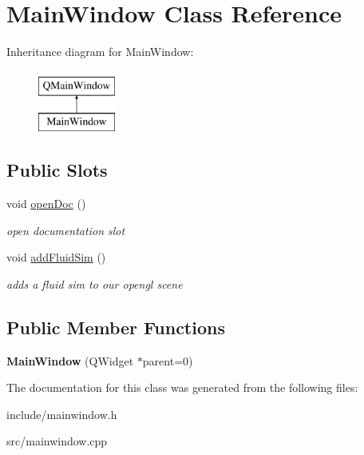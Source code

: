 \hypertarget{class_main_window}{\section{Main\-Window Class Reference}
\label{class_main_window}
}
Inheritance diagram for Main\-Window\-:\begin{figure}[H]
\begin{center}
\leavevmode
\includegraphics[height=2.000000cm]{class_main_window}
\end{center}
\end{figure}
\subsection*{Public Slots}
\begin{DoxyCompactItemize}
\item 
\hypertarget{class_main_window_a452fc3db76653e3355cd9eb81bc4f0cf}{void \hyperlink{class_main_window_a452fc3db76653e3355cd9eb81bc4f0cf}{open\-Doc} ()}\label{class_main_window_a452fc3db76653e3355cd9eb81bc4f0cf}

\begin{DoxyCompactList}\small\item\em open documentation slot \end{DoxyCompactList}\item 
\hypertarget{class_main_window_ab411c296f30fa6a6f7dffe17826dd85f}{void \hyperlink{class_main_window_ab411c296f30fa6a6f7dffe17826dd85f}{add\-Fluid\-Sim} ()}\label{class_main_window_ab411c296f30fa6a6f7dffe17826dd85f}

\begin{DoxyCompactList}\small\item\em adds a fluid sim to our opengl scene \end{DoxyCompactList}\end{DoxyCompactItemize}
\subsection*{Public Member Functions}
\begin{DoxyCompactItemize}
\item 
\hypertarget{class_main_window_a8b244be8b7b7db1b08de2a2acb9409db}{{\bfseries Main\-Window} (Q\-Widget $\ast$parent=0)}\label{class_main_window_a8b244be8b7b7db1b08de2a2acb9409db}

\end{DoxyCompactItemize}


The documentation for this class was generated from the following files\-:\begin{DoxyCompactItemize}
\item 
include/mainwindow.\-h\item 
src/mainwindow.\-cpp\end{DoxyCompactItemize}
